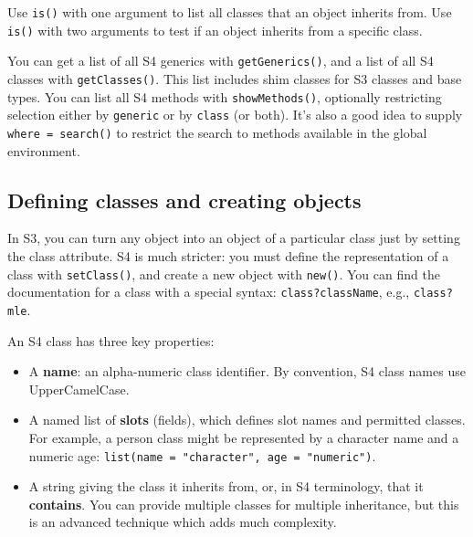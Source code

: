 Use \texttt{is()} with one argument to list all classes that an object
inherits from. Use \texttt{is()} with two arguments to test if an object
inherits from a specific class.

\begin{Shaded}
\begin{Highlighting}[]
\NormalTok{)}
\end{Highlighting}
\end{Shaded}

You can get a list of all S4 generics with \texttt{getGenerics()}, and a
list of all S4 classes with \texttt{getClasses()}. This list includes
shim classes for S3 classes and base types. You can list all S4 methods
with \texttt{showMethods()}, optionally restricting selection either by
\texttt{generic} or by \texttt{class} (or both). It's also a good idea
to supply \texttt{where = search()} to restrict the search to methods
available in the global environment.

\subsection{Defining classes and creating objects}

In S3, you can turn any object into an object of a particular class just
by setting the class attribute. S4 is much stricter: you must define the
representation of a class with \texttt{setClass()}, and create a new
object with \texttt{new()}. You can find the documentation for a class
with a special syntax: \texttt{class?className}, e.g.,
\texttt{class?mle}.  

An S4 class has three key properties:

\begin{itemize}
\item
  A \textbf{name}: an alpha-numeric class identifier. By convention, S4
  class names use UpperCamelCase.
\item
  A named list of \textbf{slots} (fields), which defines slot names and
  permitted classes. For example, a person class might be represented by
  a character name and a numeric age:
  \texttt{list(name = "character", age = "numeric")}. 
\item
  A string giving the class it inherits from, or, in S4 terminology,
  that it \textbf{contains}. You can provide multiple classes for
  multiple inheritance, but this is an advanced technique which adds
  much complexity.
\end{itemize}

